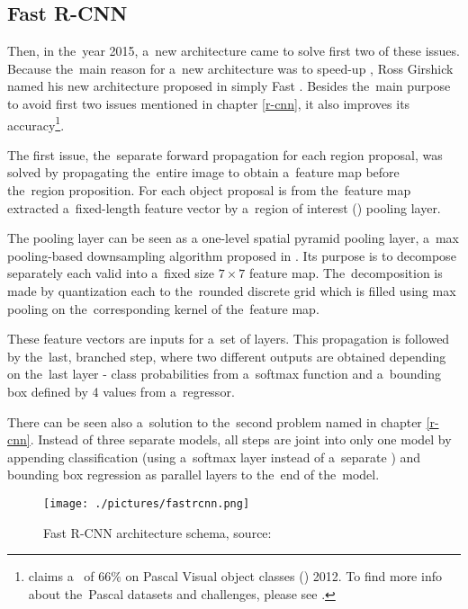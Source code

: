 \subsection{Fast R-CNN}
\label{fast-rcnn}

Then, in the~year 2015, a~new architecture came to solve first two of these issues. 
Because the~main reason for a~new architecture was to speed-up , Ross 
Girshick named his new architecture proposed in \cite{fast-rcnn} simply Fast 
. Besides the~main purpose to avoid first two issues mentioned in 
chapter \ref{r-cnn}, it also improves its accuracy\footnote{\cite{fast-rcnn} 
claims a~ of $66 \%$ on Pascal Visual object classes () 2012. To 
find more info about the~Pascal  datasets and challenges, please see 
\cite{voc}.}.

The first issue, the~separate forward propagation for each region proposal, was 
solved by propagating the~entire image to obtain a~feature map before the~region 
proposition. For each object proposal is from the~feature map extracted
a~fixed-length feature vector by a~region of interest () pooling layer.

The  pooling layer can be seen as a one-level spatial pyramid pooling 
layer, a~max pooling-based downsampling algorithm proposed in \cite{spp}. Its 
purpose is to decompose separately each valid  into a~fixed size $7 
\times 7$ feature map. The~decomposition is made by quantization each  
to the~rounded discrete grid which is filled using max pooling on
the~corresponding kernel of the~feature map.

These feature vectors are inputs for a~set of  layers. This propagation 
is followed by the~last, branched step, where two different outputs are obtained 
depending on the~last layer - class probabilities from a~softmax function and
a~bounding box defined by 4 values from a~regressor.

There can be seen also a~solution to the~second problem named in chapter 
\ref{r-cnn}. Instead of three separate models, all steps are joint into only one 
model by appending classification (using a~softmax layer instead of a~separate 
) and bounding box regression as parallel layers to the~end of
the~model.

\begin{figure}[H]
   \centering
	\texttt{[image: ./pictures/fastrcnn.png]}
	\caption[Fast R-CNN architecture]{Fast R-CNN architecture schema, source: 
\cite{fast-rcnn}}
      \label{fig:fast-rcnn}
\end{figure}

